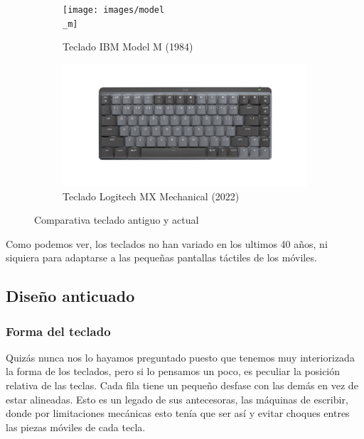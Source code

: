 \begin{figure}[H]
  \begin{subfigure}[b]{.5\textwidth}
    \centering
    \texttt{[image: images/model\\\_m]}
    \caption{Teclado IBM Model M (1984)}
  \end{subfigure} 
  \hfill
  \begin{subfigure}[b]{.5\textwidth}
    \centering
    \includegraphics[width=\textwidth]{images/logitech}
    \caption{Teclado Logitech MX Mechanical (2022)}
  \end{subfigure}
  \caption{Comparativa teclado antiguo y actual}
\end{figure}


Como podemos ver, los teclados no han variado en los ultimos 40 años, ni siquiera para adaptarse a las pequeñas pantallas táctiles de los móviles.

\subsection{Diseño anticuado}
    \subsubsection{Forma del teclado}
    Quizás nunca nos lo hayamos preguntado puesto que tenemos muy interiorizada la forma de los teclados, pero si lo pensamos un poco, es peculiar la posición relativa de las teclas. Cada fila tiene un pequeño desfase con las demás en vez de estar alineadas. Esto es un legado de sus antecesoras, las máquinas de escribir, donde por limitaciones mecánicas esto tenía que ser así y evitar choques entres las piezas móviles de cada tecla.

